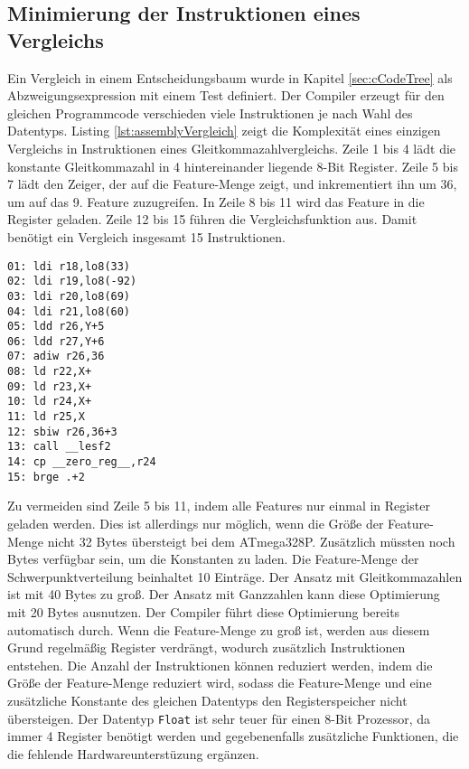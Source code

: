 \subsection{Minimierung der Instruktionen eines Vergleichs}
Ein Vergleich in einem Entscheidungsbaum wurde in Kapitel \ref{sec:cCodeTree} als Abzweigungsexpression mit einem Test definiert. Der Compiler erzeugt für den gleichen Programmcode verschieden viele Instruktionen
je nach Wahl des Datentyps.
\newline
\newline
Listing \ref{lst:assemblyVergleich} zeigt die Komplexität eines einzigen Vergleichs in Instruktionen eines Gleitkommazahlvergleichs. Zeile 1 bis 4 lädt die konstante Gleitkommazahl in 4 hintereinander liegende
8-Bit Register. Zeile 5 bis 7 lädt den Zeiger, der auf die Feature-Menge zeigt, und inkrementiert ihn um 36, um auf das 9. Feature zuzugreifen. In Zeile 8 bis 11 wird das Feature in die Register geladen. Zeile 12 bis 15 führen die
Vergleichsfunktion aus. Damit benötigt ein Vergleich insgesamt 15 Instruktionen.
\begin{lstlisting}[label=lst:assemblyVergleich,caption={Vergleich von Feature als Gleitkommazahl mit konstanter Gleitkommazahl.}]
01: ldi r18,lo8(33)
02: ldi r19,lo8(-92)
03: ldi r20,lo8(69)
04: ldi r21,lo8(60)
05: ldd r26,Y+5
06: ldd r27,Y+6
07: adiw r26,36
08: ld r22,X+
09: ld r23,X+
10: ld r24,X+
11: ld r25,X
12: sbiw r26,36+3
13: call __lesf2
14: cp __zero_reg__,r24
15: brge .+2
\end{lstlisting}
Zu vermeiden sind Zeile 5 bis 11, indem alle Features nur einmal in Register geladen werden. Dies ist allerdings nur möglich, wenn die Größe der Feature-Menge nicht 32 Bytes übersteigt bei dem
ATmega328P. Zusätzlich müssten noch Bytes verfügbar sein, um die Konstanten zu laden. Die Feature-Menge der Schwerpunktverteilung beinhaltet 10 Einträge. Der Ansatz mit Gleitkommazahlen ist mit 40 Bytes zu groß.
Der Ansatz mit Ganzzahlen kann diese Optimierung mit 20 Bytes ausnutzen. Der Compiler führt diese Optimierung bereits automatisch durch. Wenn die Feature-Menge zu groß ist, werden aus diesem Grund regelmäßig
Register verdrängt, wodurch zusätzlich Instruktionen entstehen. Die Anzahl der Instruktionen können reduziert werden, indem die Größe der Feature-Menge reduziert wird, sodass die Feature-Menge und eine
zusätzliche Konstante des gleichen Datentyps den Registerspeicher nicht übersteigen.
\newline
\newline
Der Datentyp \texttt{Float} ist sehr teuer für einen 8-Bit Prozessor, da immer 4 Register benötigt werden und gegebenenfalls zusätzliche Funktionen, die die fehlende Hardwareunterstüzung ergänzen.
